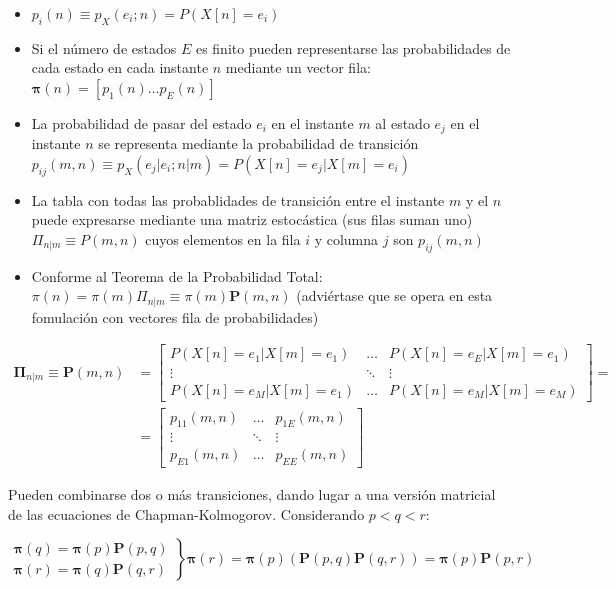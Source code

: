 \documentclass[11pt]{article}
\providecommand{\tightlist}{%
      \setlength{\itemsep}{0pt}\setlength{\parskip}{0pt}}
\begin{document}
\begin{itemize}
\tightlist
\item
  \(p_i(n) \equiv p_X(e_i ; n) = P(X[n]=e_i)\)
\item
  Si el número de estados \(E\) es finito pueden representarse las
  probabilidades de cada estado en cada instante \(n\) mediante un
  vector fila: \(\boldsymbol{\pi}(n) = [p_1(n) \ldots p_E(n)]\)
\item
  La probabilidad de pasar del estado \(e_i\) en el instante \(m\) al
  estado \(e_j\) en el instante \(n\) se representa mediante la
  probabilidad de transición
  \(p_{ij}(m,n) \equiv p_X(e_j | e_i ; n | m) = P(X[n] = e_j | X[m] = e_i)\)
\item
  La tabla con todas las probablidades de transición entre el instante
  \(m\) y el \(n\) puede expresarse mediante una matriz estocástica (sus
  filas suman uno) \(\Pi_{n | m} \equiv P(m,n)\) cuyos elementos en la
  fila \(i\) y columna \(j\) son \(p_{ij}(m,n)\)
\item
  Conforme al Teorema de la Probabilidad Total:
  \(\pi(n) = \pi(m) \Pi_{n | m} \equiv \pi(m)\mathbf{P}(m,n)\)
  (adviértase que se opera en esta fomulación con vectores fila de
  probabilidades)
\end{itemize}

 \begin{align*}
\boldsymbol{\Pi}_{n | m} \equiv \mathbf{P}(m,n) &= 
\begin{bmatrix}
  P(X[n] = e_1 | X[m] = e_1) & \ldots & P(X[n] = e_E | X[m] = e_1)\\
  \vdots & \ddots & \vdots\\
  P(X[n] = e_M | X[m] = e_1) & \ldots & P(X[n] = e_M | X[m] = e_M) 
\end{bmatrix} =\\
&= \begin{bmatrix}
  p_{11}(m,n) & \ldots & p_{1E}(m,n)\\
  \vdots & \ddots & \vdots\\
  p_{E1}(m,n) & \ldots & p_{EE}(m,n)
 \end{bmatrix}
\end{align*}

Pueden combinarse dos o más transiciones, dando lugar a una versión
matricial de las ecuaciones de Chapman-Kolmogorov. Considerando
\(p < q < r\):

\[
\left. \begin{array}{c}
\boldsymbol{\pi}(q) = \boldsymbol{\pi}(p)\mathbf{P}(p,q)\\
\boldsymbol{\pi}(r) = \boldsymbol{\pi}(q)\mathbf{P}(q,r)
\end{array} \right\} 
\boldsymbol{\pi}(r) =  \boldsymbol{\pi}(p)\left(\mathbf{P}(p,q)\mathbf{P}(q,r)\right) = 
\boldsymbol{\pi}(p)\mathbf{P}(p,r)
\]
\end{document}
